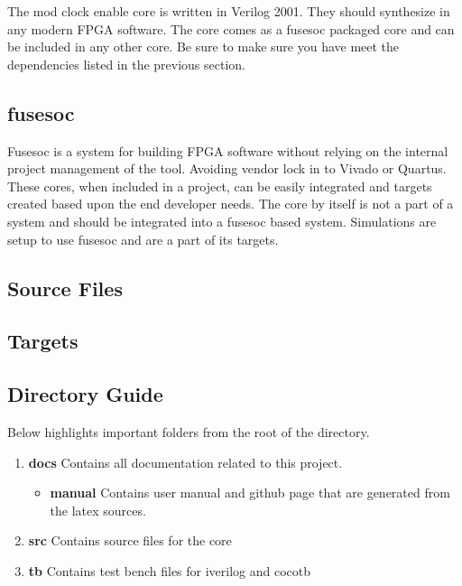 \par
The mod clock enable core is written in Verilog 2001. They should synthesize in any modern FPGA software. The core comes as a fusesoc packaged core and can be
included in any other core. Be sure to make sure you have meet the dependencies listed in the previous section.

\subsection{fusesoc}
\par
Fusesoc is a system for building FPGA software without relying on the internal project management of the tool. Avoiding vendor lock in to Vivado or Quartus.
These cores, when included in a project, can be easily integrated and targets created based upon the end developer needs. The core by itself is not a part of
a system and should be integrated into a fusesoc based system. Simulations are setup to use fusesoc and are a part of its targets.

\subsection{Source Files}



\subsection{Targets}



\subsection{Directory Guide}

\par
Below highlights important folders from the root of the directory.

\begin{enumerate}
  \item \textbf{docs} Contains all documentation related to this project.
    \begin{itemize}
      \item \textbf{manual} Contains user manual and github page that are generated from the latex sources.
    \end{itemize}
  \item \textbf{src} Contains source files for the core
  \item \textbf{tb} Contains test bench files for iverilog and cocotb
\end{enumerate}

